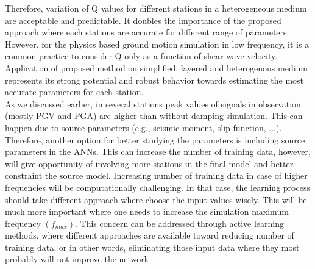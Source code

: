 Therefore, variation of Q values for different stations in a heterogeneous medium are acceptable and predictable. It doubles the importance of the proposed approach where each stations are accurate for different range of parameters. However, for the physics based ground motion simulation in low frequency, it is a common practice to consider Q only as a function of shear wave velocity. Application of proposed method on simplified, layered and heterogenous medium represents its strong potential and robust behavior towards estimating the most accurate parameters for each station.\\

As we discussed earlier, in several stations peak values of signals in observation (mostly PGV and PGA) are higher than without damping simulation. This can happen due to source parameters (e.g., seismic moment, slip function, ...). Therefore, another option for better studying the parameters is including source parameters in the ANNs. This can increase the number of training data, however, will give opportunity of involving more stations in the final model and better constraint the source model. Increasing number of training data in case of higher frequencies will be computationally challenging. In that case, the learning process should take different approach where choose the input values wisely. This will be much more important where one needs to increase the simulation maximum frequency $(f_{max})$.  This concern can be addressed through active learning methods, where different approaches are available toward reducing number of training data, or in other words, eliminating those input data where they most probably will not improve the network \citep[e.g., see][ and the references therein.]{settles.tr09} 



 


